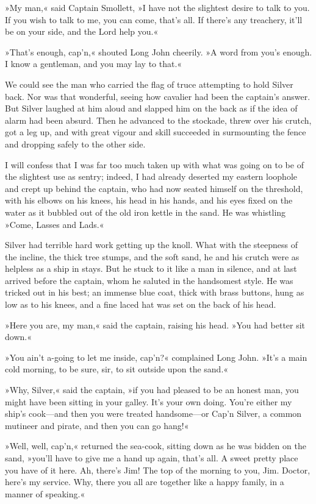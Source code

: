 »My man,« said Captain Smollett, »I have not the slightest desire to talk to you. If you wish to talk to me, you can come, that's all. If there's any treachery, it'll be on your side, and the Lord help you.«

»That's enough, cap'n,« shouted Long John cheerily. »A word from you's enough. I know a gentleman, and you may lay to that.«

We could see the man who carried the flag of truce attempting to hold Silver back. Nor was that wonderful, seeing how cavalier had been the captain's answer. But Silver laughed at him aloud and slapped him on the back as if the idea of alarm had been absurd. Then he advanced to the stockade, threw over his crutch, got a leg up, and with great vigour and skill succeeded in surmounting the fence and dropping safely to the other side.

I will confess that I was far too much taken up with what was going on to be of the slightest use as sentry; indeed, I had already deserted my eastern loophole and crept up behind the captain, who had now seated himself on the threshold, with his elbows on his knees, his head in his hands, and his eyes fixed on the water as it bubbled out of the old iron kettle in the sand. He was whistling »Come, Lasses and Lads.«

Silver had terrible hard work getting up the knoll. What with the steepness of the incline, the thick tree stumps, and the soft sand, he and his crutch were as helpless as a ship in stays. But he stuck to it like a man in silence, and at last arrived before the captain, whom he saluted in the handsomest style. He was tricked out in his best; an immense blue coat, thick with brass buttons, hung as low as to his knees, and a fine laced hat was set on the back of his head.

»Here you are, my man,« said the captain, raising his head. »You had better sit down.«

»You ain't a-going to let me inside, cap'n?« complained Long John. »It's a main cold morning, to be sure, sir, to sit outside upon the sand.«

»Why, Silver,« said the captain, »if you had pleased to be an honest man, you might have been sitting in your galley. It's your own doing. You're either my ship's cook—and then you were treated handsome—or Cap'n Silver, a common mutineer and pirate, and then you can go hang!«

»Well, well, cap'n,« returned the sea-cook, sitting down as he was bidden on the sand, »you'll have to give me a hand up again, that's all. A sweet pretty place you have of it here. Ah, there's Jim! The top of the morning to you, Jim. Doctor, here's my service. Why, there you all are together like a happy family, in a manner of speaking.«

